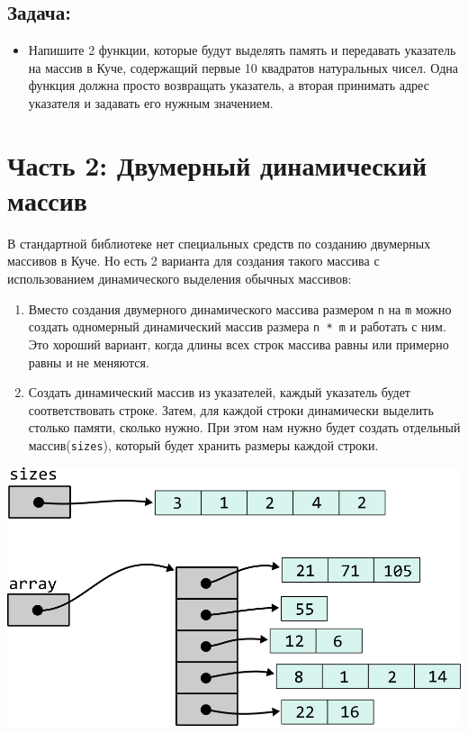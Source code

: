 \documentclass{article}
\begin{document}
\subsection*{Задача:}
\begin{itemize}
\item Напишите 2 функции, которые будут выделять память и передавать указатель на массив в Куче, содержащий первые 10 квадратов натуральных чисел. Одна функция должна просто возвращать указатель, а вторая принимать адрес указателя и задавать его нужным значением.
\end{itemize}

\newpage
\section*{Часть 2: Двумерный динамический массив}
В стандартной библиотеке нет специальных средств по созданию двумерных массивов в Куче. Но есть 2 варианта для создания
такого массива с использованием динамического выделения обычных массивов:
\begin{enumerate}
\item Вместо создания двумерного динамического массива размером \texttt{n} на \texttt{m} можно создать одномерный динамический массив размера \texttt{n * m} и работать с ним.
Это хороший вариант, когда длины всех строк массива равны или примерно равны и не меняются.
\item Создать динамический массив из указателей, каждый указатель будет 
соответствовать строке. Затем, для каждой строки динамически выделить столько памяти,
сколько нужно. При этом нам нужно будет создать отдельный массив(\texttt{sizes}), который будет хранить
размеры каждой строки.
\end{enumerate}
\begin{center}
\includegraphics[scale=0.9]{../images/two_dim_dynamic_array.png}
\end{center}
\end{document}
